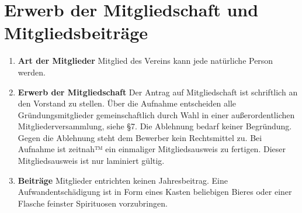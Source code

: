 \documentclass{scrartcl}
\begin{document}
    \section{Erwerb der Mitgliedschaft und Mitgliedsbeiträge}
        \begin{enumerate}
            \item \textbf{Art der Mitglieder} \newline
                Mitglied des Vereins kann jede natürliche Person werden.
            \item \textbf{Erwerb der Mitgliedschaft} \newline
                Der Antrag auf Mitgliedschaft ist schriftlich an den Vorstand zu stellen. 
                Über die Aufnahme entscheiden alle Gründungsmitglieder gemeinschaftlich durch Wahl in einer außerordentlichen Mitgliederversammlung, siehe \S 7.
                Die Ablehnung bedarf keiner Begründung. 
                Gegen die Ablehnung steht dem Bewerber kein Rechtsmittel zu.
                Bei Aufnahme ist zeitnah™ ein einmaliger Mitgliedsausweis zu fertigen. Dieser Mitgliedsausweis ist nur laminiert gültig. 
            \item \textbf{Beiträge} \newline
                Mitglieder entrichten keinen Jahresbeitrag. 
                Eine Aufwandentschädigung ist in Form eines Kasten beliebigen Bieres oder einer Flasche feinster Spirituosen vorzubringen. 
        \end{enumerate}
\end{document}
